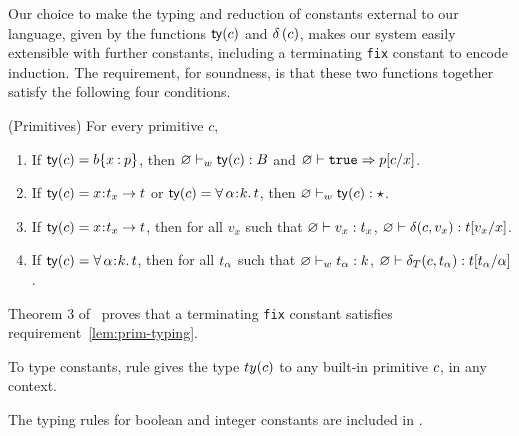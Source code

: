Our choice to make the typing and reduction
of constants external to our language,
\ie given by the functions
$\ty{\sconst}$ and $\tc{\sconst}$,
makes our system easily extensible with further constants, 
including a terminating \texttt{fix} constant to encode induction.
%
The requirement, for soundness, is that
these two functions %
together satisfy the following four conditions.
%
\begin{requirement}(Primitives) \label{lem:prim-typing}
For every primitive $c$,
\begin{enumerate}
\item If $\ty{\sconst} = \breft{\sbase}{x}{\spred}$, then
  $\isWellFormed{\varnothing}{\ty{\sconst}}{\skbase}$ and
  $\imply{\varnothing}{\ttrue}{\subst{\spred}{x}{\sconst}}$.
\item If $\ty{\sconst} = \functype{x}{\stype_x}{\stype}$ or
         $\ty{\sconst} = \polytype{\al}{\skind}{\stype}$, then
         $\isWellFormed{\varnothing}{\ty{\sconst}}{\skstar}$.
\item If ${\ty{\sconst}} = \functype{x}{\stype_x}{\stype}$,
      then for all $v_x$ such that
     $\hastype{\varnothing}{v_x}{\stype_x}$,
    $\hastype{\varnothing}{\delta(\sconst,v_x)}{\subst{\stype}{x}{v_x}}$.
\item If ${\ty{\sconst}} = \polytype{\al}{\skind}{\stype}$,
      then for all $\stype_\al$ such that
     $\isWellFormed{\varnothing}{\stype_\al}{\skind}$,
    $\hastype{\varnothing}{\delta_T(\sconst,\stype_\al)}{\subst{\stype}{\al}{\stype_\al}}$.
\end{enumerate}
\end{requirement}

Theorem 3 of~\cite{Vazou14} proves that 
a terminating \texttt{fix} constant satisfies
requirement~\ref{lem:prim-typing}. 

To type constants, rule \tPrim gives the type
$ty(\sconst)$ to any built-in
primitive $\sconst$, in any context.
%
\begin{fullversion}
The typing rules for boolean and integer
constants are included in \tPrim.
\end{fullversion}

